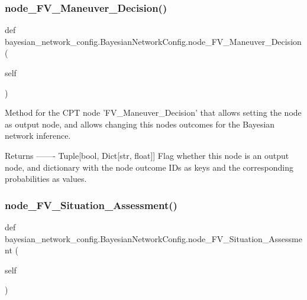 \subsubsection{\texorpdfstring{node\+\_\+\+F\+V\+\_\+\+Maneuver\+\_\+\+Decision()}{node\_FV\_Maneuver\_Decision()}}
{\footnotesize\ttfamily def bayesian\+\_\+network\+\_\+config.\+Bayesian\+Network\+Config.\+node\+\_\+\+F\+V\+\_\+\+Maneuver\+\_\+\+Decision (\begin{DoxyParamCaption}\item[{}]{self }\end{DoxyParamCaption})}

\begin{DoxyVerb}Method for the CPT node 'FV_Maneuver_Decision' that allows setting the node as output node,
and allows changing this nodes outcomes for the Bayesian network inference.

Returns
-------
Tuple[bool, Dict[str, float]]
    Flag whether this node is an output node, and dictionary with the node outcome IDs as keys
    and the corresponding probabilities as values.
\end{DoxyVerb}
 \mbox{\label{classbayesian__network__config_1_1_bayesian_network_config_a73e6055c566983256fceb8f6c587d20a}} 
\subsubsection{\texorpdfstring{node\+\_\+\+F\+V\+\_\+\+Situation\+\_\+\+Assessment()}{node\_FV\_Situation\_Assessment()}}
{\footnotesize\ttfamily def bayesian\+\_\+network\+\_\+config.\+Bayesian\+Network\+Config.\+node\+\_\+\+F\+V\+\_\+\+Situation\+\_\+\+Assessment (\begin{DoxyParamCaption}\item[{}]{self }\end{DoxyParamCaption})}

